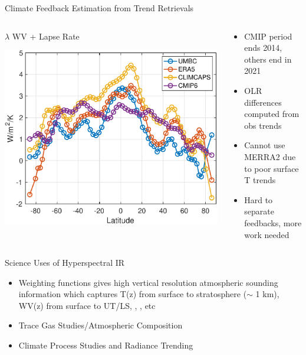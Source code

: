\documentclass[10pt,t]{beamer}
\begin{document}
\begin{frame}{Climate Feedback Estimation from Trend Retrievals}
  \begin{columns}[T]
    \begin{column}{0.5\columnwidth}
      \vspace{-0.2in}
      \begin{block}{\footnotesize $\lambda$ WV + Lapse Rate}
        \vspace{-0.15in}
        \begin{center}
          \includegraphics[width=0.85\linewidth]{Figslls/wv_plus_lapse_lambda.pdf}
        \end{center}
      \end{block}
    \end{column}

    \begin{column}{0.5\columnwidth}
      \begin{footnotesize}
        \begin{itemize}
        \item CMIP period ends 2014, others end in 2021
        \item OLR differences computed from obs trends
        \item Cannot use MERRA2 due to poor surface T trends
        \item Hard to separate feedbacks, more work needed
        \end{itemize}
      \end{footnotesize}
    \end{column}
  \end{columns}
\end{frame}
\begin{frame}{Science Uses of Hyperspectral IR}
\begin{itemize}
  \item Weighting functions gives high vertical resolution atmospheric sounding information which captures 
         T(z) from surface to stratosphere ($\sim$ 1 km), WV(z) from surface to UT/LS, \ozone, \cd, \methane etc
  \item Trace Gas Studies/Atmospheric Composition
  \item Climate Process Studies and Radiance Trending
  \end{itemize}
\end{frame}
\end{document}
